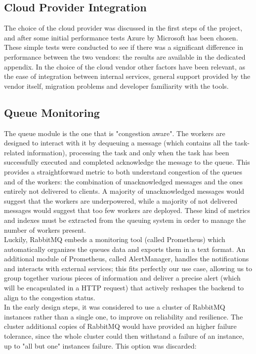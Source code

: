 \subsection{Cloud Provider Integration}
  The choice of the cloud provider was discussed in the first steps of the project, and after some initial performance tests Azure by Microsoft has been chosen. These simple tests were conducted to see if there was a significant difference in performance between the two vendors: the results are available in the dedicated appendix. In the choice of the cloud vendor other factors have been relevant, as the ease of integration between internal services, general support provided by the vendor itself, migration problems and developer familiarity with the tools.

\subsection{Queue Monitoring}
  The queue module is the one that is "congestion aware". The workers are designed to interact with it by dequeuing a message (which contains all the task-related information), processing the task and only when the task has been successfully executed and completed acknowledge the message to the queue. This provides a straightforward metric to both understand congestion of the queues and of the workers: the combination of unacknowledged messages and the ones entirely not delivered to clients. A majority of unacknowledged messages would suggest that the workers are underpowered, while a majority of not delivered messages would suggest that too few workers are deployed. These kind of metrics and indexes must be extracted from the queuing system in order to manage the number of workers present.\\
  Luckily, RabbitMQ embeds a monitoring tool (called Prometheus) which automatically organizes the queues data and exports them in a text format. An additional module of Prometheus, called AlertManager, handles the notifications and interacts with external services; this fits perfectly our use case, allowing us to group together various pieces of information and deliver a precise alert (which will be encapsulated in a HTTP request) that actively reshapes the backend to align to the congestion status.\\
  In the early design steps, it was considered to use a cluster of RabbitMQ instances rather than a single one, to improve on reliability and resilience. The cluster additional copies of RabbitMQ would have provided an higher failure tolerance, since the whole cluster could then withstand a failure of an instance, up to "all but one" instances failure. This option was discarded:
